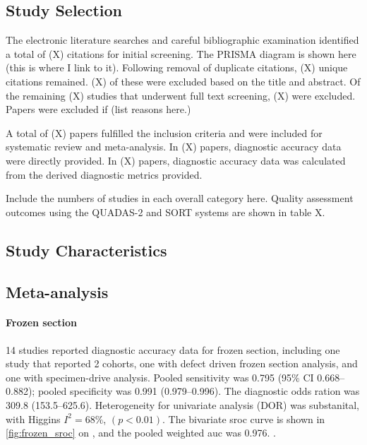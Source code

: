 \subsection{Study Selection}

The electronic literature searches and careful bibliographic examination identified a total of (X) citations for initial screening.
The PRISMA diagram is shown here (this is where I link to it).
Following removal of duplicate citations, (X) unique citations remained.
(X) of these were excluded based on the title and abstract.
Of the remaining (X) studies that underwent full text screening, (X) were excluded.
Papers were excluded if (list reasons here.)

A total of (X) papers fulfilled the inclusion criteria and were included for systematic review and meta-analysis.
In (X) papers, diagnostic accuracy data were directly provided. 
In (X) papers, diagnostic accuracy data was calculated from the derived diagnostic metrics provided.

Include the numbers of studies in each overall category here.
Quality assessment outcomes using the QUADAS-2 and SORT systems are shown in table X.




\subsection{Study Characteristics}

\subsection{Meta-analysis}

\paragraph{Frozen section}

14 studies reported diagnostic accuracy data for frozen section, including one study \cite{amitImprovingRateNegative2016} that reported 2 cohorts, one with defect driven frozen section analysis, and one with specimen-drive analysis.
Pooled sensitivity was 0.795 (95\% CI 0.668--0.882); pooled specificity was 0.991 (0.979--0.996).
The diagnostic odds ration was 309.8 (153.5--625.6).
Heterogeneity for univariate analysis (DOR) was substanital, with Higgins $I^2 = 68\%$, $(p<0.01)$.
The bivariate \gls{sroc} curve is shown in \cref{fig:frozen_sroc} on , and the pooled weighted \gls{auc} was 0.976. 
.

